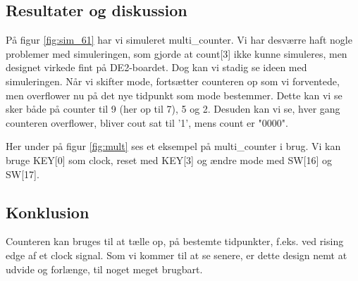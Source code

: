 \documentclass[../journal.tex]{subfiles}
\begin{document}
\subsection{Resultater og diskussion}

På figur \ref{fig:sim_61} har vi simuleret multi\_counter. Vi har desværre haft nogle problemer med simuleringen, som gjorde at count[3] ikke kunne simuleres, men designet virkede fint på DE2-boardet. Dog kan vi stadig se ideen med simuleringen. Når vi skifter mode, fortsætter counteren op som vi forventede, men overflower nu på det nye tidpunkt som mode bestemmer. Dette kan vi se sker både på counter til 9 (her op til 7), 5 og 2. Desuden kan vi se, hver gang counteren overflower, bliver cout sat til '1', mens count er "0000".


Her under på figur \ref{fig:mult} ses et eksempel på multi\_counter i brug. Vi kan bruge KEY[0] som clock, reset med KEY[3] og ændre mode med SW[16] og SW[17].


\subsection{Konklusion}

Counteren kan bruges til at tælle op, på bestemte tidpunkter, f.eks. ved rising edge af et clock signal. Som vi kommer til at se senere, er dette design nemt at udvide og forlænge, til noget meget brugbart.
\end{document}

